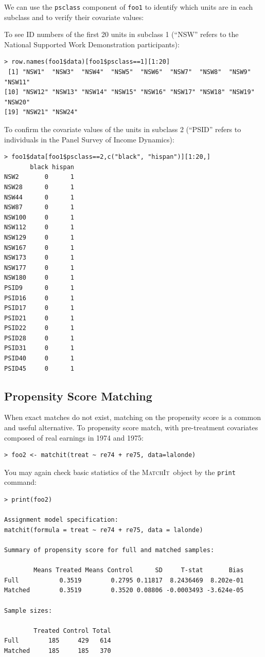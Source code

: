 \documentclass[oneside,letterpaper,titlepage]{article}
\newcommand{\MatchIt}{\textsc{MatchIt}}
\begin{document}
We can use the {\tt psclass} component of {\tt foo1} to identify which
units are in each subclass and to verify their covariate values:

To see ID numbers of the first 20 units in subclass 1 (``NSW'' refers
to the National Supported Work Demonstration participants):
\begin{verbatim}
> row.names(foo1$data)[foo1$psclass==1][1:20]
 [1] "NSW1"  "NSW3"  "NSW4"  "NSW5"  "NSW6"  "NSW7"  "NSW8"  "NSW9"  "NSW11"
[10] "NSW12" "NSW13" "NSW14" "NSW15" "NSW16" "NSW17" "NSW18" "NSW19" "NSW20"
[19] "NSW21" "NSW24"
\end{verbatim}

To confirm the covariate values of the units in subclass 2 (``PSID''
refers to individuals in the Panel Survey of Income Dynamics):
\begin{verbatim}
> foo1$data[foo1$psclass==2,c("black", "hispan")][1:20,]
       black hispan
NSW2       0      1
NSW28      0      1
NSW44      0      1
NSW87      0      1
NSW100     0      1
NSW112     0      1
NSW129     0      1
NSW167     0      1
NSW173     0      1
NSW177     0      1
NSW180     0      1
PSID9      0      1
PSID16     0      1
PSID17     0      1
PSID21     0      1
PSID22     0      1
PSID28     0      1
PSID31     0      1
PSID40     0      1
PSID45     0      1
\end{verbatim}


\subsection{Propensity Score Matching}
When exact matches do not exist, matching on the propensity score is a
common and useful alternative.  To propensity score match, with
pre-treatment covariates composed of real earnings in 1974 and 1975:

\begin{verbatim}
> foo2 <- matchit(treat ~ re74 + re75, data=lalonde)
\end{verbatim} 


You may again check basic statistics of the \MatchIt\ object by the
\texttt{print} command:

\begin{verbatim}
> print(foo2)
 
Assignment model specification:
matchit(formula = treat ~ re74 + re75, data = lalonde)
 
Summary of propensity score for full and matched samples:
 
        Means Treated Means Control      SD     T-stat       Bias
Full           0.3519        0.2795 0.11817  8.2436469  8.202e-01
Matched        0.3519        0.3520 0.08806 -0.0003493 -3.624e-05
 
Sample sizes:
 
        Treated Control Total
Full        185     429   614
Matched     185     185   370
 
\end{verbatim} 
\end{document}
